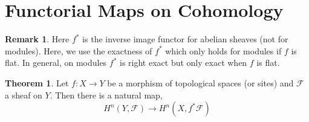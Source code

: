 \documentclass[12pt]{extarticle}
\theoremstyle{definition}
\newtheorem{theorem}{Theorem}[section]
\newtheorem{remark}{Remark}
\newcommand{\F}{\mathcal{F}}
\begin{document}
\section{Functorial Maps on Cohomology}

\newcommand{\J}{\mathcal{J}}
\newcommand{\Pic}[1]{\mathrm{Pic}\left( #1 \right)}

\begin{remark}
Here $f^*$ is the inverse image functor for abelian sheaves (not for modules). Here, we use the exactness of $f^*$ which only holds for modules if $f$ is flat. In general, on modules $f^*$ is right exact but only exact when $f$ is flat.
\end{remark}

\begin{theorem}
Let $f : X \to Y$ be a morphism of topological spaces (or sites) and $\F$ a sheaf on $Y$. Then there is a natural map,
\[ H^n(Y, \F) \to H^n(X, f^* \F) \]
\end{theorem}
\end{document}
